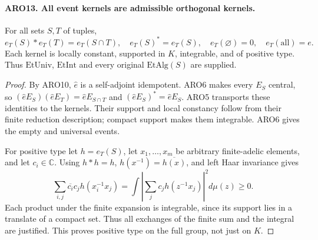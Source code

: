 \documentclass[11pt,a4paper]{article}
\numberwithin{equation}{section}
\theoremstyle{remark}\newtheorem{remark}[theorem]{Remark}
\begin{document}
\paragraph{ARO13. All event kernels are admissible orthogonal kernels.}
\label{claim:ARO13}
For all sets \(S,T\) of tuples,
\[
 e_T(S)*e_T(T)=e_T(S\cap T),\quad e_T(S)^*=e_T(S),
 \quad e_T(\varnothing)=0,\quad e_T(\mathrm{all})=e.
 \tag{ARO.15}
\]
Each kernel is locally constant, supported in \(K\), integrable,
and of positive type.  Thus \(\mathrm{EtUniv}\), \(\mathrm{EtInt}\)
and every original \(\mathrm{EtAlg}(S)\) are supplied.
\begin{proof}
By ARO10, \(\widehat e\) is a self-adjoint idempotent.  ARO6
makes every \(E_S\) central, so
\((\widehat eE_S)(\widehat eE_T)=\widehat eE_{S\cap T}\)
and \((\widehat eE_S)^*=\widehat eE_S\).  ARO5 transports these
identities to the kernels.  Their support and local constancy follow
from their finite reduction description; compact support makes
them integrable.  ARO6 gives the empty and universal events.

For positive type let \(h=e_T(S)\), let \(x_1,\ldots,x_m\) be
arbitrary finite-adelic elements, and let \(c_i\in\mathbb C\).
Using \(h*h=h\), \(h(x^{-1})=\overline{h(x)}\), and left Haar
invariance gives
\[
 \sum_{i,j}\overline{c_i}c_j h(x_i^{-1}x_j)
       =\int\left|\sum_j c_jh(z^{-1}x_j)\right|^2d\mu(z)
       \geq0.                                         \tag{ARO.16}
\]
Each product under the finite expansion is integrable, since its
support lies in a translate of a compact set.  Thus all exchanges
of the finite sum and the integral are justified.  This proves
positive type on the full group, not just on \(K\).
\end{proof}

\end{document}
